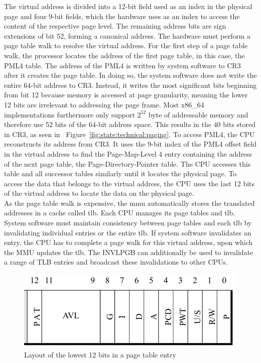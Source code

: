 The virtual address is divided into a 12-bit field used as an index in the
physical page and four 9-bit fields, which the hardware uses as an index to
access the content of the respective page level. The remaining address bits are
sign extensions of bit 52, forming a canonical address. The hardware must
perform a page table walk to resolve the virtual address. For the first step of
a page table walk, the processor locates the address of the first page table, in
this case, the PML4 table. The address of the PML4 is written by system software
to CR3 after it creates the page table. In doing so, the system software does
not write the entire 64-bit address to CR3. Instead, it writes the most
significant bits beginning from bit 12 because memory is accessed at page
granularity, meaning the lower 12 bits are irrelevant to addressing the page
frame. Most x86\_64 implementations furthermore only support $2^{52}$ byte of
addressable memory and therefore use 52 bits of the 64-bit address space. This
results in the 40 bits stored in CR3, as seen in
~Figure~\ref{fig:state:technical:paging}. To access PML4, the CPU reconstructs
its address from CR3. It uses the 9-bit index of the PML4 offset field in the
virtual address to find the Page-Map-Level 4 entry containing the address of the
next page table, the Page-Directory-Pointer table. The CPU accesses this table
and all successor tables similarly until it locates the physical page. To access
the data that belongs to the virtual address, the CPU uses the last 12 bits of
the virtual address to locate the data on the physical page. \\

As the page table walk is expensive, the \gls{mmu} automatically stores
the translated addresses in a cache called \gls{tlb}.
Each CPU manages its page tables and \gls{tlb}. System software must
maintain consistency between page tables and each \gls{tlb} by
invalidating individual entries or the entire \gls{tlb}. If system
software invalidates an entry, the CPU has to complete a page walk for this
virtual address, upon which the MMU updates the \gls{tlb}. The INVLPGB
can additionally be used to invalidate a range of TLB entries and broadcast
these invalidations to other CPUs. \\

\begin{figure}
    \begin{center}
        \includegraphics[width=.6\textwidth]{images/paging_rights_placeholder.png}
        \caption{Layout of the lowest 12 bits in a page table entry}
        \label{fig:state:technical:paging_rights}
    \end{center}
\end{figure}


